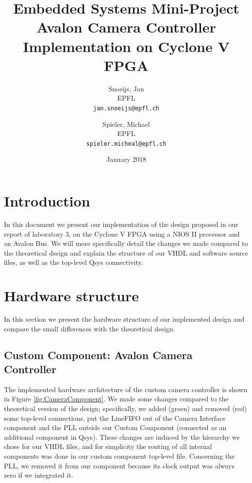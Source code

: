 \documentclass{article}
\title{Embedded Systems Mini-Project\\
 Avalon Camera Controller Implementation on Cyclone V FPGA}
\author{
  Snoeijs, Jan\\
  EPFL\\
  \texttt{jan.snoeijs@epfl.ch}
  \and
  Spieler, Michael\\
  EPFL\\
  \texttt{spieler.micheal@epfl.ch}
  }
\date{January 2018}
\begin{document}
\maketitle

\section{Introduction}
In this document we present our implementation of the design proposed in our report of laboratory 3, on the Cyclone V FPGA using a NIOS II processor and an Avalon Bus. We will more specifically detail the changes we made compared to the theoretical design and explain the structure of our VHDL and software source files, as well as the top-level Qsys connectivity.

\section{Hardware structure}

In this section we present the hardware structure of our implemented design and compare the small differences with the theoretical design.

\subsection{Custom Component: Avalon Camera Controller}

The implemented hardware architecture of the custom camera controller is shown in Figure \ref{fig:CameraComponent}. We made some changes compared to the theoretical version of the design; specifically, we added (green) and removed (red) some top-level connections, put the LineFIFO out of the Camera Interface component and the PLL outside our Custom Component (connected as an additional component in Qsys). These changes are induced by the hierarchy we chose for our VHDL files, and for simplicity the routing of all internal components was done in our custom component top-level file. Concerning the PLL, we removed it from our component because its clock output was always zero if we integrated it.
\end{document}
